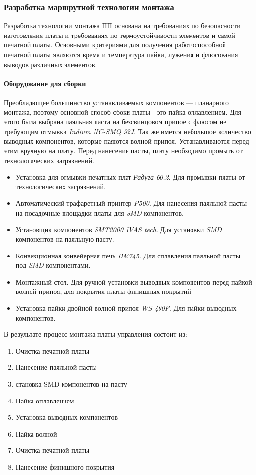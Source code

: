 \subsubsection{Разработка маршрутной технологии монтажа}
Разработка технологии монтажа ПП основана на требованиях по
безопасности изготовления платы и требованиях по термоустойчивости
элементов и самой печатной платы.
Основными критериями для получения работоспособной печатной
платы являются время и температура пайки, лужения и флюсования выводов
различных элементов.

\paragraph{Оборудование для сборки}
Преобладющее большинство устанавливаемых компонентов --- планарного монтажа,
поэтому основной способ сбоки платы - это пайка оплавлением. Для этого была
выбрана паяльная паста на безсвинцовом припое с флюсом не требующим отмывки
\textit{Indium NC-SMQ 92J}.
Так же имется небольшое количество выводных компонентов, которые паяются
волной припоя. Устанавливаются перед этим вручную на плату.
Перед нанесение пасты, плату необходимо промыть от технологических загрязнений.

\begin{itemize}
    \item Установка для отмывки печатных плат \textit{Радуга-60.2}. Для промывки
            платы от технологических загрязнений.
    \item Автоматический трафаретный принтер \textit{P500}. Для нанесения
            паяльной пасты на посадочные площадки платы для \textit{SMD}
            компонентов.
    \item Установщик компонентов \textit{SMT2000 IVAS tech}. Для установки
            \textit{SMD} компонентов на паяльную пасту.
    \item Конвекционная конвейерная печь \textit{BM745}. Для оплавления паяльной
            пасты под \textit{SMD} компонентами.
    \item Монтажный стол. Для ручной установки выводных компонентов перед пайкой
            волной припоя, для покрытия платы финишных покрытий.
    \item Установка пайки двойной волной припоя \textit{WS-400F}. Для пайки
            выводных компонентов.
\end{itemize}

В результате процесс монтажа платы управления состоит из:
\begin{enumerate}
    \item Очистка печатной платы
    \item Нанесение паяльной пасты
    \item становка SMD компонентов на пасту
    \item Пайка оплавлением
    \item Установка выводных компонентов
    \item Пайка волной
    \item Очистка печатной платы
    \item Нанесение финишного покрытия
\end{enumerate}

